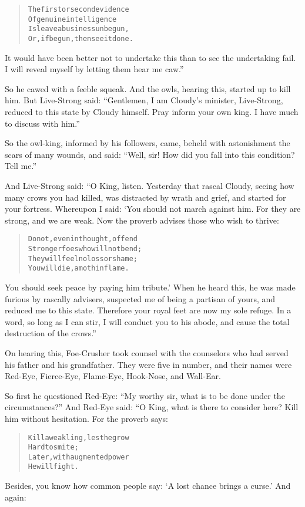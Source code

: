 \documentclass[article, twoside, 14pt]{memoir}
\renewenvironment{verbatim}{%
\begin{quote}%
\vskip -10pt%
\begin{alltt}\normalfont\large}{\end{alltt}%
\end{quote}%
\vskip -10pt
} %
\begin{document}
\begin{verbatim}
The first or second evidence
Of genuine intelligence
Is{\textemdash}leave a business unbegun,
Or, if begun, then see it done.
\end{verbatim}
It would have been better not to undertake this than to see the
undertaking fail. I will reveal myself by letting them hear me
caw.”

So he cawed with a feeble squeak. And the owls, hearing this,
started up to kill him. But Live-Strong said:
``Gentlemen, I am Cloudy's minister, Live-Strong, reduced to this state by Cloudy himself. Pray inform your own king. I have much to discuss with him.''

So the owl-king, informed by his followers, came, beheld with
astonishment the scars of many wounds, and said:
``Well, sir! How did you fall into this condition? Tell me.''

And Live-Strong said: “O King, listen. Yesterday that rascal
Cloudy, seeing how many crows you had killed, was distracted by
wrath and grief, and started for your fortress. Whereupon I said:
‘You should not march against him. For they are strong, and we are
weak. Now the proverb advises those who wish to thrive:

\begin{verbatim}
Do not, even in thought, offend
Stronger foes who will not bend;
They will feel no loss or shame;
You will die, a moth in flame.
\end{verbatim}
You should seek peace by paying him tribute.' When he heard this,
he was made furious by rascally advisers, suspected me of being a
partisan of yours, and reduced me to this state. Therefore your
royal feet are now my sole refuge. In a word, so long as I can
stir, I will conduct you to his abode, and cause the total
destruction of the crows.”

On hearing this, Foe-Crusher took counsel with the counselors who
had served his father and his grandfather. They were five in
number, and their names were Red-Eye, Fierce-Eye, Flame-Eye,
Hook-Nose, and Wall-Ear.

So first he questioned Red-Eye:
``My worthy sir, what is to be done under the circumstances?'' And
Red-Eye said: “O King, what is there to consider here? Kill him
without hesitation. For the proverb says:

\begin{verbatim}
Kill a weakling, lest he grow
    Hard to smite;
Later, with augmented power
    He will fight.
\end{verbatim}
Besides, you know how common people say:
`A lost chance brings a curse.' And again:
\end{document}
